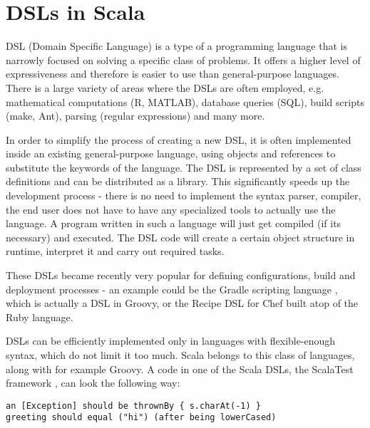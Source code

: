 



\section{DSLs in Scala}
\label{sec:dsls}

DSL (Domain Specific Language) is a type of a programming language that is narrowly focused on solving a specific class of problems. It offers a higher level of expressiveness and therefore is easier to use than general-purpose languages. There is a large variety of areas where the DSLs are often employed, e.g. mathematical computations (R, MATLAB), database queries (SQL), build scripts (make, Ant), parsing (regular expressions) and many more.

In order to simplify the process of creating a new DSL, it is often implemented inside an existing general-purpose language, using objects and references to substitute the keywords of the language. The DSL is represented by a set of class definitions and can be distributed as a library. This significantly speeds up the development process - there is no need to implement the syntax parser, compiler, the end user does not have to have any specialized tools to actually use the language. A program written in such a language will just get compiled (if its necessary) and executed. The DSL code will create a certain object structure in runtime, interpret it and carry out required tasks.

These DSLs became recently very popular for defining configurations, build and deployment processes - an example could be the Gradle scripting language \cite{noauthor_gradle_nodate}, which is actually a DSL in Groovy, or the Recipe DSL for Chef \cite{noauthor_chef_nodate} built atop of the Ruby language.


DSLs can be efficiently implemented only in languages with flexible-enough syntax, which do not limit it too much. Scala belongs to this class of languages, along with for example Groovy. A code in one of the Scala DSLs, the ScalaTest framework \cite{noauthor_scalatest:_2017}, can look the following way:

\lstset{style=Scala}
\begin{lstlisting}
an [Exception] should be thrownBy { s.charAt(-1) }
greeting should equal ("hi") (after being lowerCased)
\end{lstlisting}

